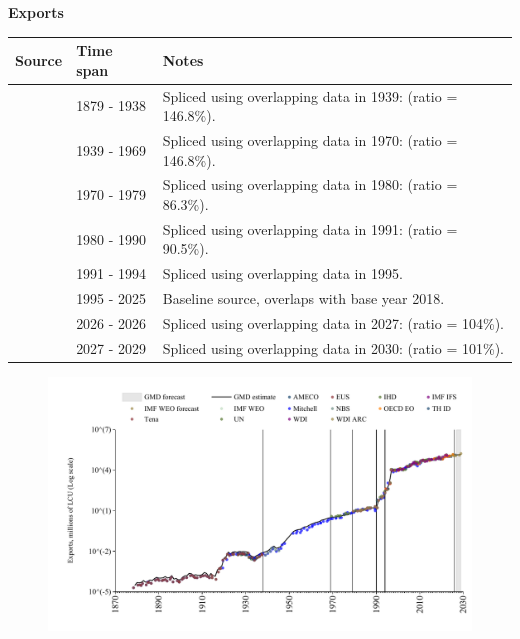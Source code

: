 \documentclass[12pt,a4paper,landscape]{article}
\begin{document}
\begin{adjustbox}{max totalsize={\paperwidth}{\paperheight},center}
\begin{minipage}[t][\textheight][t]{\textwidth}
\vspace*{0.5cm}
{}
\begin{center}
{\Large\bfseries Exports}
\end{center}
\vspace{0.5cm}
\begin{table}[H]
\centering
\small
\begin{tabular}{|l|l|l|}
\hline
\textbf{Source} & \textbf{Time span} & \textbf{Notes} \\
\hline
\rowcolor{white}\cite{Tena}& 1879 - 1938 &Spliced using overlapping data in 1939: (ratio = 146.8\%). \\
\rowcolor{lightgray}\cite{Mitchell}& 1939 - 1969 &Spliced using overlapping data in 1970: (ratio = 146.8\%). \\
\rowcolor{white}\cite{UN}& 1970 - 1979 &Spliced using overlapping data in 1980: (ratio = 86.3\%). \\
\rowcolor{lightgray}\cite{WDI}& 1980 - 1990 &Spliced using overlapping data in 1991: (ratio = 90.5\%). \\
\rowcolor{white}\cite{AMECO}& 1991 - 1994 &Spliced using overlapping data in 1995. \\
\rowcolor{lightgray}\cite{OECD_EO}& 1995 - 2025 &Baseline source, overlaps with base year 2018. \\
\rowcolor{white}\cite{AMECO}& 2026 - 2026 &Spliced using overlapping data in 2027: (ratio = 104\%). \\
\rowcolor{lightgray}\cite{IMF_WEO_forecast}& 2027 - 2029 &Spliced using overlapping data in 2030: (ratio = 101\%). \\
\hline
\end{tabular}
\end{table}
\begin{figure}[H]
\centering
\includegraphics[width=\textwidth,height=0.6\textheight,keepaspectratio]{graphs/BGR_exports.pdf}
\end{figure}
\end{minipage}
\end{adjustbox}
\end{document}
